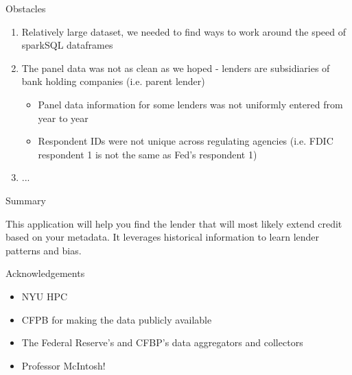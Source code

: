 \documentclass{beamer}
\begin{document}
\begin{frame}{Obstacles}

\begin{enumerate}

\item Relatively large dataset, we needed to find ways to work around the speed of sparkSQL dataframes
\item The panel data was not as clean as we hoped - lenders are subsidiaries of bank holding companies (i.e. parent lender)
  \begin{itemize}
     \item Panel data information for some lenders was not uniformly entered from year to year
      \item Respondent IDs were not unique across regulating agencies (i.e. FDIC respondent 1 is not the same as Fed's respondent 1)
  \end{itemize}
\item ...

\end{enumerate}

\end{frame}



\begin{frame}{Summary}

This application will help you find the lender that will most likely extend credit based on your metadata.  It leverages historical information to learn lender patterns and bias.  

\end{frame}

\begin{frame}{Acknowledgements}

\begin{itemize}
  \item NYU HPC
  \item CFPB for making the data publicly available
  \item The Federal Reserve's and CFBP's data aggregators and collectors
  \item Professor McIntosh!

\end{itemize}

\end{frame}
\end{document}
